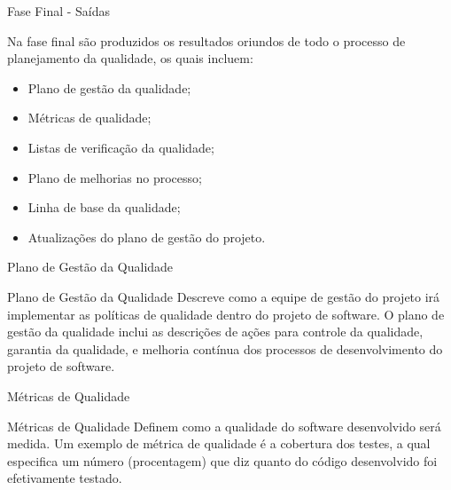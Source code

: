\documentclass[xcolor=x11names,compress]{beamer}
\begin{document}
\begin{frame}{Fase Final - Saídas}

Na fase final são produzidos os resultados oriundos de todo o processo de planejamento da qualidade, os quais incluem:

\begin{itemize}
\itemsep 5mm

\item Plano de gestão da qualidade;

\item Métricas de qualidade;

\item Listas de verificação da qualidade;

\item Plano de melhorias no processo;

\item Linha de base da qualidade;

\item Atualizações do plano de gestão do projeto.

\end{itemize}

\end{frame}

\begin{frame}{Plano de Gestão da Qualidade}

\begin{alertblock}{Plano de Gestão da Qualidade}
Descreve como a equipe de gestão do projeto irá implementar as políticas de qualidade dentro do projeto de software. O plano de gestão da qualidade inclui as descrições de ações para controle da qualidade, garantia da qualidade, e melhoria contínua dos processos de desenvolvimento do projeto de software.
\end{alertblock}

\end{frame}

\begin{frame}{Métricas de Qualidade}

\begin{alertblock}{Métricas de Qualidade}
Definem como a qualidade do software desenvolvido será medida. Um exemplo de métrica de qualidade é a cobertura dos testes, a qual especifica um número (procentagem) que diz quanto do código desenvolvido foi efetivamente testado.
\end{alertblock}

\end{frame}
\end{document}
